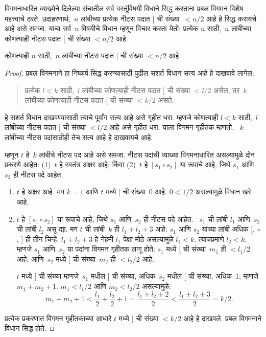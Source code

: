 विगमनाधारित व्याख्येने दिलेल्या संचातील सर्व वस्तूंविषयी विधाने सिद्ध करताना प्रबल विगमन विशेष महत्त्वाचे ठरते. उदाहरणार्थ,~$n$ लांबीच्या प्रत्येक नीटस पदात $[$ ची संख्या~$< n/2$ आहे हे सिद्ध करायचे आहे असे समजा. याचा सर्व~$n$ विषयीचे विधान म्हणून विचार करता येतो: प्रत्येक $n$ साठी,~$n$ लांबीच्या कोणत्याही नीटस पदात $[$ ची संख्या $< n/2$ आहे.

\begin{prop}
कोणत्याही $n$ साठी,~$n$ लांबीच्या नीटस पदात $[$ ची संख्या $< n/2$ आहे.
\end{prop}

\begin{proof}
प्रबल विगमनाने हा निष्कर्ष सिद्ध करण्यासाठी पुढील सशर्त विधान सत्य आहे हे दाखवावे लागेल:
\begin{quote}
प्रत्येक $l < k$ साठी,~$l$ लांबीच्या कोणत्याही नीटस पदात $[$ ची संख्या $< l/2$ असेल, तर~$k$ लांबीच्या कोणत्याही नीटस पदात $[$ ची संख्या $< k/2$ असते.
\end{quote}
हे सशर्त विधान दाखवण्यासाठी त्याचे पूर्वांग सत्य आहे असे गृहीत धरा. म्हणजे कोणत्याही $l<k$ साठी,~$l$ लांबीच्या नीटस पदात $[$ ची संख्या $< l/2$ आहे असे गृहीत धरा. याला विगमन गृहीतक म्हणतो. ~$k$ लांबीच्या नीटस पदांसाठीही तेच सत्य आहे हे दाखवायचे आहे.

म्हणून $t$ हे~$k$ लांबीचे नीटस पद आहे असे समजा. नीटस पदांची व्याख्या विगमनाधारित असल्यामुळे दोन प्रकरणे आहेत: (1)~$t$ हे स्वतंत्र अक्षर आहे; किंवा (2)~$t$ हे $[s_1 \circ s_2]$ या रूपाचे आहे, जिथे $s_1$ आणि~$s_2$ ही नीटस पदे आहेत.
\begin{enumerate}
\item $t$ हे अक्षर आहे. मग $k = 1$ आणि $t$ मध्ये $[$ ची संख्या~$0$ आहे. $0 < 1/2$ असल्यामुळे विधान खरे आहे.
\item $t$ हे $[s_1 \circ s_2]$ या रूपाचे आहे, जिथे $s_1$ आणि~$s_2$ ही नीटस पदे आहेत. ~$s_1$ ची लांबी $l_1$ आणि~$s_2$ ची लांबी $l_2$ असू द्या. मग $t$ ची लांबी~$k$ ही $l_1+l_2+3$ आहे: $s_1$ आणि $s_2$ यांच्या लांबी अधिक $[$, $\circ$, $]$ ही तीन चिन्हे. $l_1+l_2+3$ हे नेहमी $l_1$ पेक्षा मोठे असल्यामुळे $l_1 < k$. त्याचप्रमाणे $l_2 < k$. म्हणजे $s_1$ आणि~$s_2$ या पदांना विगमन गृहीतक लागू होते: $s_1$ मध्ये $[$ ची संख्या~$m_1$ ही $< l_1/2$ आहे; आणि~$s_2$ मध्ये $[$ ची संख्या~$m_2$ ही $< l_2/2$ आहे.

$t$ मध्ये $[$ ची संख्या म्हणजे~$s_1$ मधील $[$ ची संख्या, अधिक~$s_2$ मधील $[$ ची संख्या, अधिक~$1$; म्हणजे $m_1 + m_2 + 1$. $m_1 < l_1/2$ आणि $m_2 < l_2/2$ असल्यामुळे:
\[
  m_1 + m_2 + 1 < \frac{l_1}{2} + \frac{l_2}{2} + 1 = \frac{l_1+l_2+2}{2} < \frac{l_1+l_2+3}{2} = k/2.
\]
\end{enumerate}
प्रत्येक प्रकरणात विगमन गृहीतकाच्या आधारे $t$ मध्ये $[$ ची संख्या $< k/2$ आहे हे दाखवले. प्रबल विगमनाने विधान सिद्ध होते.
\end{proof}

